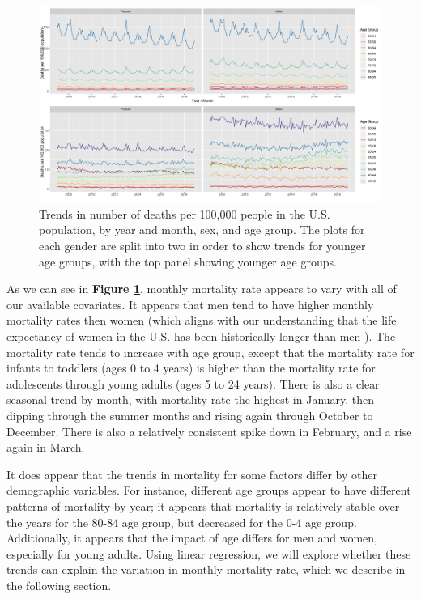 \documentclass[letterpaper, 11pt]{article}
\begin{document}
\begin{figure}[h]
    \centering
    \includegraphics[width=1\textwidth, center]{../figures/eda.png}
    \caption{Trends in number of deaths per 100,000 people in the U.S. population, by year and month, sex, and age group. The plots for each gender are split into two in order to show trends for younger age groups, with the top panel showing younger age groups.}
    \label{fig:eda}
\end{figure}

As we can see in \textbf{Figure \ref{fig:eda}}, monthly mortality rate appears to vary with all of our available covariates. It appears that men tend to have higher monthly mortality rates then women (which aligns with our understanding that the life expectancy of women in the U.S. has been historically longer than men \cite{sex}). The mortality rate tends to increase with age group, except that the mortality rate for infants to toddlers (ages 0 to 4 years) is higher than the mortality rate for adolescents through young adults (ages 5 to 24 years). There is also a clear seasonal trend by month, with mortality rate the highest in January, then dipping through the summer months and rising again through October to December. There is also a relatively consistent spike down in February, and a rise again in March.

It does appear that the trends in mortality for some factors differ by other demographic variables. For instance, different age groups appear to have different patterns of mortality by year; it appears that mortality is relatively stable over the years for the 80-84 age group, but decreased for the 0-4 age group. Additionally, it appears that the impact of age differs for men and women, especially for young adults. Using linear regression, we will explore whether these trends can explain the variation in monthly mortality rate, which we describe in the following section.
\end{document}
